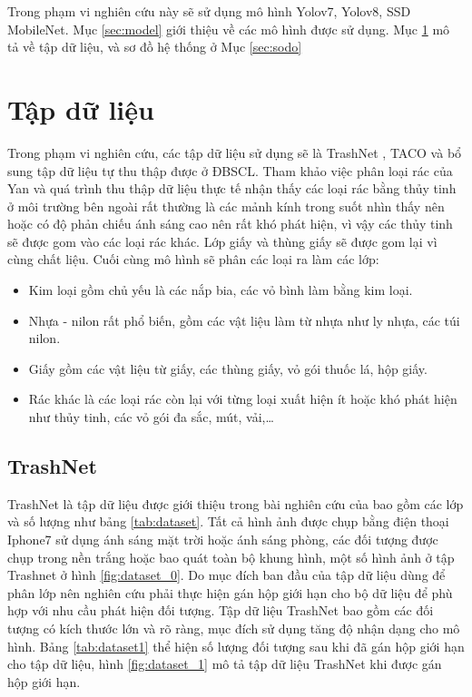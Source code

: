 \documentclass[../the.tex]{subfiles}
\begin{document}
{\fontsize{13}{12} \selectfont

Trong phạm vi nghiên cứu này sẽ sử dụng mô hình Yolov7, Yolov8, SSD MobileNet. Mục \ref{sec:model} giới thiệu về các mô hình được sử dụng. Mục \ref{sec:dataset} mô tả về tập dữ liệu, và sơ đồ hệ thống ở Mục \ref{sec:sodo}

}
\section{Tập dữ liệu}
\label{sec:dataset}

{\fontsize{13}{12} \selectfont

	Trong phạm vi nghiên cứu, các tập dữ liệu sử dụng sẽ là TrashNet \cite{yang2016classification}, TACO \cite{proença2020taco} và bổ sung tập dữ liệu tự thu thập được ở ĐBSCL.
	Tham khảo việc phân loại rác của Yan \cite{yang2016classification} và quá trình thu thập dữ liệu thực tế nhận thấy các loại rác bằng thủy tinh ở môi trường bên ngoài rất thường là các mảnh kính trong suốt nhìn thấy nên hoặc có độ phản chiếu ánh sáng cao nên rất khó phát hiện, vì vậy các thủy tinh sẽ được gom vào các loại rác khác.
	Lớp giấy và thùng giấy sẽ được gom lại vì cùng chất liệu. Cuối cùng mô hình sẽ phân các loại ra làm các lớp:
	\begin{itemize}
		\item Kim loại gồm chủ yếu là các nắp bia, các vỏ bình làm bằng kim loại.
		\item Nhựa - nilon rất phổ biến, gồm các vật liệu làm từ nhựa như ly nhựa, các túi nilon.
		\item Giấy gồm các vật liệu từ giấy, các thùng giấy, vỏ gói thuốc lá, hộp giấy.
		\item Rác khác là các loại rác còn lại với từng loại xuất hiện ít hoặc khó phát hiện như thủy tinh, các vỏ gói đa sắc,
		      mút, vải,\dots
	\end{itemize}
}

\subsection{TrashNet}
\label{sec:trashnet}
{\fontsize{13}{12} \selectfont

	TrashNet là tập dữ liệu được giới thiệu trong bài nghiên cứu của \cite{yang2016classification} bao gồm các lớp và số lượng như bảng \ref{tab:dataset}. Tất cả hình ảnh được chụp bằng điện thoại Iphone7 sử dụng ánh sáng mặt trời hoặc ánh sáng phòng, các đối tượng được chụp trong nền trắng hoặc bao quát toàn bộ khung hình, một số hình ảnh ở tập Trashnet ở hình
	\ref{fig:dataset_0}.
	Do mục đích ban đầu của tập dữ liệu dùng để phân lớp nên nghiên cứu phải thực hiện gán hộp giới hạn cho bộ dữ liệu để phù hợp với nhu cầu phát hiện đối tượng. Tập dữ liệu TrashNet bao gồm các đối tượng có kích thước lớn và rõ ràng, mục đích sử dụng tăng độ nhận dạng cho mô hình. Bảng \ref{tab:dataset1} thể hiện số lượng đối tượng sau khi đã gán hộp giới hạn cho tập dữ liệu, hình
	\ref{fig:dataset_1} mô tả tập dữ liệu TrashNet khi được gán hộp giới hạn.

}
\end{document}
